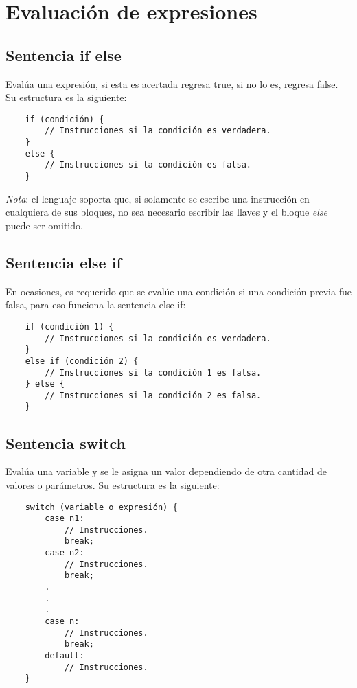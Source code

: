 \section{Evaluación de expresiones}

\subsection{Sentencia if else}
\hspace{0.55cm}Evalúa una expresión, si esta es acertada regresa true, si no lo es, regresa false. Su estructura es la siguiente:
\begin{lstlisting}
    if (condición) {
        // Instrucciones si la condición es verdadera.
    }
    else {
        // Instrucciones si la condición es falsa.
    }
\end{lstlisting}

\textit{Nota}: el lenguaje soporta que, si solamente se escribe una instrucción en cualquiera de sus bloques, no sea necesario escribir las llaves y el bloque \textit{else} puede ser omitido.


\subsection{Sentencia else if}
\hspace{0.55cm}En ocasiones, es requerido que se evalúe una condición si una condición previa fue falsa, para eso funciona la sentencia else if:
\begin{lstlisting}
    if (condición 1) {
        // Instrucciones si la condición es verdadera.
    }
    else if (condición 2) {
        // Instrucciones si la condición 1 es falsa.
    } else {
        // Instrucciones si la condición 2 es falsa.
    }
\end{lstlisting}


\subsection{Sentencia switch}
\hspace{0.55cm}Evalúa una variable y se le asigna un valor dependiendo de otra cantidad de valores o parámetros. Su estructura es la siguiente:
\begin{lstlisting}
    switch (variable o expresión) {
        case n1:
            // Instrucciones.
            break;
        case n2:
            // Instrucciones.
            break;
        .
        .
        .
        case n:
            // Instrucciones.
            break;
        default:
            // Instrucciones.
    }
\end{lstlisting}

